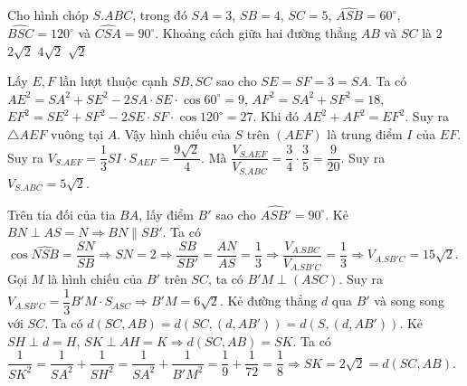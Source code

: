 \begin{ex}%
Cho hình chóp $S.ABC$, trong đó $SA=3$, $SB=4$, $SC=5$, $\widehat{ASB}=60^\circ$, $\widehat{BSC}=120^\circ$ và $\widehat{CSA}=90^\circ$. Khoảng cách giữa hai đường thẳng $AB$ và $SC$ là
\choice
{$2$}
{\True $2\sqrt{2}$}
{ $4\sqrt{2}$}
{$\sqrt{2}$}
\loigiai
{\immini
{
Lấy $E, F$ lần lượt thuộc cạnh $SB, SC$ sao cho $SE=SF=3=SA$. Ta có $AE^2=SA^2+SE^2-2SA\cdot SE\cdot\cos60^\circ=9$, $AF^2=SA^2+SF^2=18$, $EF^2=SE^2+SF^2-2SE\cdot SF\cdot\cos120^\circ=27$. Khi đó $AE^2+AF^2=EF^2$. Suy ra $\triangle AEF$ vuông tại $A$. Vậy hình chiếu của $S$ trên $(AEF)$ là trung điểm $I$ của $EF$. Suy ra $V_{S.AEF}=\dfrac{1}{3}SI\cdot S_{AEF}=\dfrac{9\sqrt{2}}{4}$. Mà $\dfrac{V_{S.AEF}}{V_{S.ABC}}=\dfrac{3}{4}\cdot\dfrac{3}{5}=\dfrac{9}{20}$. Suy ra $V_{S.ABC}=5\sqrt{2}$.
}
{
}
\immini
{
Trên tia đối của tia $BA$, lấy điểm $B'$ sao cho $\widehat{ASB'}=90^\circ$. Kẻ $BN\perp AS=N\Rightarrow BN\parallel SB'$. Ta có $\cos\widehat{NSB}=\dfrac{SN}{SB}\Rightarrow SN=2\Rightarrow\dfrac{SB}{SB'}=\dfrac{AN}{AS}=\dfrac{1}{3}\Rightarrow\dfrac{V_{A.SBC}}{V_{A.SB'C}}=\dfrac{1}{3}\Rightarrow V_{A.SB'C}=15\sqrt{2}$. Gọi $M$ là hình chiếu của $B'$ trên $SC$, ta có $B'M\perp (ASC)$. Suy ra $V_{A.SB'C}=\dfrac{1}{3}B'M\cdot S_{ASC}\Rightarrow B'M=6\sqrt{2}$. Kẻ đường thẳng $d$ qua $B'$ và song song với $SC$. Ta có $d(SC, AB)=d(SC, (d, AB'))=d(S, (d, AB'))$. Kẻ $SH\perp d=H$, $SK\perp AH=K\Rightarrow d(SC, AB)=SK$. Ta có $\dfrac{1}{SK^2}=\dfrac{1}{SA^2}+\dfrac{1}{SH^2}=\dfrac{1}{SA^2}+\dfrac{1}{B'M^2}=\dfrac{1}{9}+\dfrac{1}{72}=\dfrac{1}{8}\Rightarrow SK=2\sqrt{2}=d(SC, AB)$.
}
{
}
}
\end{ex}
